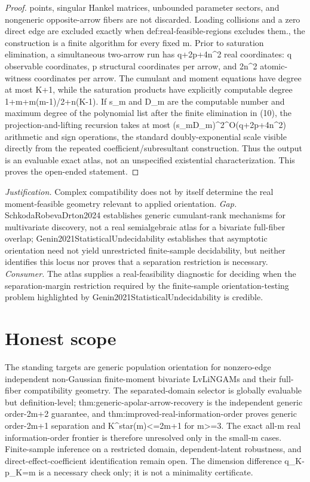 \documentclass{article}
\begin{document}
\begin{proof}
points, singular Hankel matrices, unbounded parameter sectors, and nongeneric opposite-arrow fibers are not discarded. Loading collisions and a zero direct edge are excluded exactly when def:real-feasible-regions excludes them.\n\nFinally, the construction is a finite algorithm for every fixed m. Prior to saturation elimination, a simultaneous two-arrow run has q+2p+4n^2 real coordinates: q observable coordinates, p structural coordinates per arrow, and 2n^2 atomic-witness coordinates per arrow. The cumulant and moment equations have degree at most K+1, while the saturation products have explicitly computable degree 1+m+m(m-1)/2+n(K-1). If s_m and D_m are the computable number and maximum degree of the polynomial list after the finite elimination in (10), the projection-and-lifting recursion takes at most (s_mD_m)^{2^{O(q+2p+4n^2)}} arithmetic and sign operations, the standard doubly-exponential scale visible directly from the repeated coefficient/subresultant construction. Thus the output is an evaluable exact atlas, not an unspecified existential characterization. This proves the open-ended statement.
\end{proof}
\par\smallskip\noindent \textit{Justification.} Complex compatibility does not by itself determine the real moment-feasible geometry relevant to applied orientation. \textit{Gap.} SchkodaRobevaDrton2024 establishes generic cumulant-rank mechanisms for multivariate discovery, not a real semialgebraic atlas for a bivariate full-fiber overlap; Genin2021StatisticalUndecidability establishes that asymptotic orientation need not yield unrestricted finite-sample decidability, but neither identifies this locus nor proves that a separation restriction is necessary. \textit{Consumer.} The atlas supplies a real-feasibility diagnostic for deciding when the separation-margin restriction required by the finite-sample orientation-testing problem highlighted by Genin2021StatisticalUndecidability is credible.

\section{Honest scope}

The standing targets are generic population orientation for nonzero-edge independent non-Gaussian finite-moment bivariate LvLiNGAMs and their full-fiber compatibility geometry. The separated-domain selector is globally evaluable but definition-level; thm:generic-apolar-arrow-recovery is the independent generic order-2m+2 guarantee, and thm:improved-real-information-order proves generic order-2m+1 separation and K^star(m)<=2m+1 for m>=3. The exact all-m real information-order frontier is therefore unresolved only in the small-m cases. Finite-sample inference on a restricted domain, dependent-latent robustness, and direct-effect-coefficient identification remain open. The dimension difference q_K-p_K=m is a necessary check only; it is not a minimality certificate.
\end{document}

